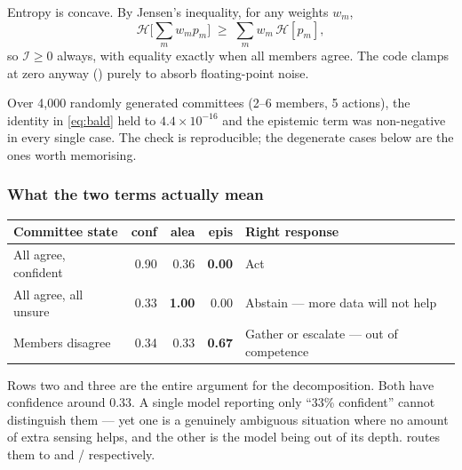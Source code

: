 Entropy is concave. By Jensen's inequality, for any weights $w_m$,
\begin{equation}
\mathcal{H}\Big[\sum_m w_m p_m\Big] \;\ge\; \sum_m w_m\, \mathcal{H}[p_m],
\end{equation}
so $\mathcal{I} \ge 0$ always, with equality exactly when all members agree.
The code clamps at zero anyway () purely to
absorb floating-point noise.

\begin{okbox}
Over 4{,}000 randomly generated committees (2--6 members, 5 actions), the
identity in \eqref{eq:bald} held to $4.4\times10^{-16}$ and the epistemic term
was non-negative in every single case. The check is reproducible; the
degenerate cases below are the ones worth memorising.
\end{okbox}

\subsubsection{What the two terms actually mean}

\begin{center}
\renewcommand{\arraystretch}{1.3}
\begin{tabular}{@{}>{\raggedright\arraybackslash}p{4.2cm}rrr>{\raggedright\arraybackslash}p{5.0cm}@{}}
\toprule
\rowcolor{conclavebg}
{\sffamily\bfseries\color{conclaveblue}Committee state} &
{\sffamily\bfseries\color{conclaveblue}conf} &
{\sffamily\bfseries\color{conclaveblue}alea} &
{\sffamily\bfseries\color{conclaveblue}epis} &
{\sffamily\bfseries\color{conclaveblue}Right response} \\
\midrule
All agree, confident & 0.90 & 0.36 & \textbf{0.00} & Act \\
All agree, all unsure & 0.33 & \textbf{1.00} & 0.00 & Abstain --- more data will not help \\
Members disagree & 0.34 & 0.33 & \textbf{0.67} & Gather or escalate --- out of competence \\
\bottomrule
\end{tabular}
\end{center}

\noindent Rows two and three are the entire argument for the decomposition.
Both have confidence around $0.33$. A single model reporting only ``33\%
confident'' cannot distinguish them --- yet one is a genuinely ambiguous
situation where no amount of extra sensing helps, and the other is the model
being out of its depth.  routes them to
 and / respectively.

